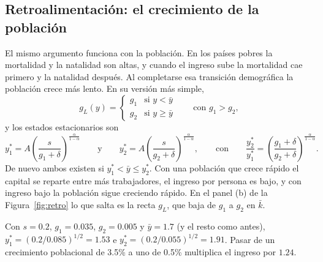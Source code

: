 \documentclass[12pt,letterpaper]{article}
\begin{document}
\subsection{Retroalimentación: el crecimiento de la población}

El mismo argumento funciona con la población. En los países pobres la mortalidad y la natalidad son altas, y cuando el ingreso sube la mortalidad cae primero y la natalidad después. Al completarse esa transición demográfica la población crece más lento. En su versión más simple,
\[
  g_L(y)=\begin{cases}g_1 & \text{si } y<\bar y\\ g_2 & \text{si } y\geq\bar y\end{cases}
  \qquad\text{con } g_1>g_2 ,
\]
y los estados estacionarios son
\[
  y_1^*=A\left(\frac{s}{g_1+\delta}\right)^{\frac{\alpha}{1-\alpha}}
  \qquad\text{y}\qquad
  y_2^*=A\left(\frac{s}{g_2+\delta}\right)^{\frac{\alpha}{1-\alpha}},
  \qquad\text{con}\qquad
  \frac{y_2^*}{y_1^*}=\left(\frac{g_1+\delta}{g_2+\delta}\right)^{\frac{\alpha}{1-\alpha}} .
\]
De nuevo ambos existen si $y_1^*<\bar y\leq y_2^*$. Con una población que crece rápido el capital se reparte entre más trabajadores, el ingreso por persona es bajo, y con ingreso bajo la población sigue creciendo rápido. En el panel (b) de la Figura~\ref{fig:retro} lo que salta es la recta $g_L$, que baja de $g_1$ a $g_2$ en $\bar k$.

\begin{intuicion}
Con $s=0.2$, $g_1=0.035$, $g_2=0.005$ y $\bar y=1.7$ (y el resto como antes), $y_1^*=(0.2/0.085)^{1/2}=1.53$ e $y_2^*=(0.2/0.055)^{1/2}=1.91$. Pasar de un crecimiento poblacional de 3.5\% a uno de 0.5\% multiplica el ingreso por $1.24$.
\end{intuicion}
\end{document}
